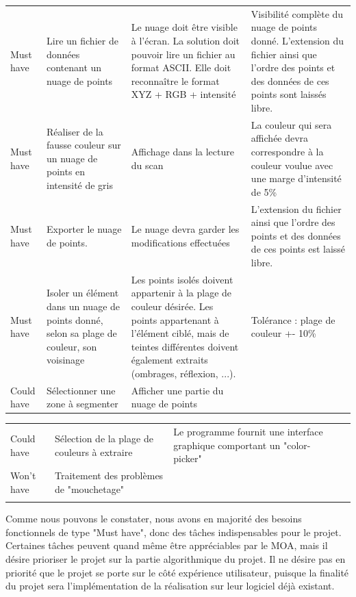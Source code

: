 \documentclass[12pt,titlepage,french]{article}
\begin{document}
\noindent\begin{tabu} to \toprule
     &&&\\\toprule
Must have
& Lire un fichier de données contenant un nuage de points
& Le nuage doit être visible à l'écran. La solution doit pouvoir lire un fichier au format ASCII. Elle doit reconnaître le format XYZ + RGB + intensité
& Visibilité complète du nuage de points donné. L'extension du fichier ainsi que l'ordre des points et des données de ces points sont laissés libre.\\\midrule
Must have
& Réaliser de la fausse couleur sur un nuage de points en intensité de gris
& Affichage dans la lecture du scan
& La couleur qui sera affichée devra correspondre à la couleur voulue avec une marge d'intensité de 5\%\\\midrule
Must have
& Exporter le nuage de points.
& Le nuage devra garder les modifications effectuées
& L'extension du fichier ainsi que l'ordre des points et des données de ces points est laissé libre.\\\midrule
Must have
& Isoler un élément dans un nuage de points donné, selon sa plage de couleur, son voisinage
& Les points isolés doivent appartenir à la plage de couleur désirée.
Les points appartenant à l'élément ciblé, mais de teintes différentes doivent également extraits (ombrages, réflexion, ...).
& Tolérance : plage de couleur +- 10\% \\\midrule
Could have
& Sélectionner une zone à segmenter
& Afficher une partie du nuage de points
& \\\bottomrule

\end{tabu}

\noindent\begin{tabu} to \toprule
     &&&\\\toprule
Could have
& Sélection de la plage de couleurs à extraire
& Le programme fournit une interface graphique comportant un "color-picker"
& \\\midrule
Won't have
& Traitement des problèmes de "mouchetage"
&
&\\\bottomrule \\
\end{tabu}

Comme nous pouvons le constater, nous avons en majorité des besoins fonctionnels de type "Must have", donc des tâches indispensables pour le projet. Certaines tâches peuvent quand même être appréciables par le MOA, mais il désire prioriser le projet sur la partie algorithmique du projet. Il ne désire pas en priorité que le projet se porte sur le côté expérience utilisateur, puisque la finalité du projet sera l'implémentation de la réalisation sur leur logiciel déjà existant.
\end{document}
